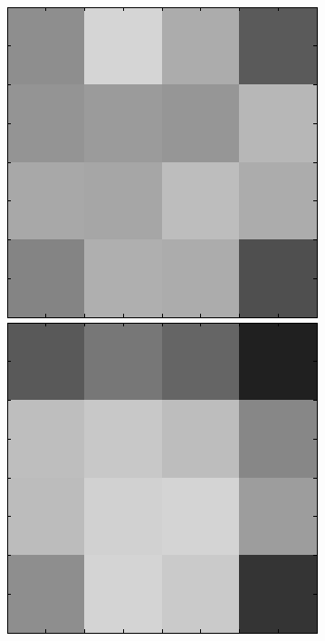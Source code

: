 \begin{figure}[ht]
 \includegraphics[width=\textwidth*11/100]{ch5/figures/XM2VTS_6_3.png}
 \includegraphics[width=\textwidth*11/100]{ch5/figures/XM2VTS_7_3.png}

\end{figure}

